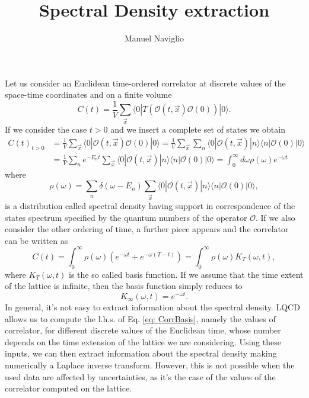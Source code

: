 \documentclass[a4paper,10pt]{article}
\begin{document}
\title{Spectral Density extraction}
\author{Manuel Naviglio}
\date{}
\maketitle

Let us consider an Euclidean time-ordered correlator at discrete values of the space-time coordinates and on a finite volume
\begin{equation}
C(t) = \frac{1}{V}\sum_{\vec{x}} \langle 0 | T( \mathcal{O}(t,\vec{x}) \mathcal{O}(0)) |0\rangle.
\end{equation}
If we consider the case $t>0$ and we insert a complete set of states we obtain
\begin{equation}\begin{split}
C(t)_{t>0} &= \frac{1}{V}\sum_{\vec{x}} \langle 0 |  \mathcal{O}(t,\vec{x}) \mathcal{O}(0)|0\rangle  = \frac{1}{V}\sum_{\vec{x}} \sum_n \langle 0 |  \mathcal{O}(t,\vec{x}) |n\rangle \langle n | \mathcal{O}(0) |0\rangle \\& = \frac{1}{V} \sum_n  e^{-E_n t} \sum_{\vec{x}} \langle 0 |  \mathcal{O}(t,\vec{x}) |n\rangle \langle n | \mathcal{O}(0) |0\rangle = \int_0^\infty d \omega \rho(\omega) e^{-\omega t}
\end{split}\end{equation}
where 
\begin{equation}
\rho(\omega) = \sum_n \delta(\omega- E_n) \sum_{\vec{x}} \langle 0 |  \mathcal{O}(t,\vec{x}) |n\rangle \langle n | \mathcal{O}(0) |0\rangle, 
\end{equation}
is a distribution called spectral density having support in correspondence of the states spectrum specified by the quantum numbers of the operator $\mathcal{O}$. If we also consider the other ordering of time, a further piece appears and the correlator can be written as
\begin{equation}\label{eq: CorrBasis}
C(t) = \int_0^\infty \rho(\omega) (e^{-\omega t} + e^{-\omega(T-t)}) = \int_0^\infty \rho(\omega) K_T(\omega, t),
\end{equation}
where $K_T(\omega, t)$ is the so called basis function. If we assume that the time extent of the lattice is infinite, then the basis function simply reduces to
\begin{equation}
K_\infty (\omega, t) = e^{-\omega t}.
\end{equation} 
In general, it's not easy to extract information about the spectral density. LQCD allows us to compute the l.h.s. of Eq. \eqref{eq: CorrBasis}, namely the values of correlator, for different discrete values of the Euclidean time, whose number depends on the time extension of the lattice we are considering. Using these inputs, we can then extract information about the spectral density making numerically a Laplace inverse transform. However, this is not possible when the used data are affected by uncertainties, as it's the case of the values of the correlator computed on the lattice. \\
\end{document}
